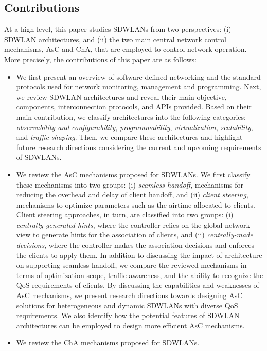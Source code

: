 \subsection{Contributions}
\label{contributions_sec}
At a high level, this paper studies SDWLANs from two perspectives: (i) SDWLAN architectures, and (ii) the two main central network control mechanisms, AsC and ChA, that are employed to control network operation.
More precisely, the contributions of this paper are as follows:
%
%
\begin{itemize}
	\item 
	We first present an overview of software-defined networking and the standard protocols used for network monitoring, management and programming.
	Next, we review SDWLAN architectures and reveal their main objective, components, interconnection protocols, and APIs provided.
	Based on their main contribution, we classify architectures into the following categories: \textit{observability and configurability},  \textit{programmability}, \textit{virtualization}, \textit{scalability}, and \textit{traffic shaping}.
	Then, we compare these architectures and highlight future research directions considering the current and upcoming requirements of SDWLANs. 
	\item We review the AsC mechanisms proposed for SDWLANs.
	We first classify these mechanisms into two groups:  
	(i) \textit{seamless handoff}, mechanisms for reducing the overhead and delay of client handoff, 
	and (ii) \textit{client steering}, mechanisms to optimize parameters such as the airtime allocated to clients.
	Client steering approaches, in turn, are classified into two groups: 
	(i) \textit{centrally-generated hints}, where the controller relies on the global network view to generate hints for the association of clients, and (ii) \textit{centrally-made decisions}, where the controller makes the association decisions and enforces the clients to apply them.
	In addition to discussing the impact of architecture on supporting seamless handoff, we compare the reviewed mechanisms in terms of optimization scope, traffic awareness, and the ability to recognize the QoS requirements of clients. 
	By discussing the capabilities and weaknesses of AsC mechanisms, we present research directions towards designing AsC solutions for heterogeneous and dynamic SDWLANs with diverse QoS requirements. 
	We also identify how the potential features of SDWLAN architectures can be employed to design more efficient AsC mechanisms.	
	\item We review the ChA mechanisms proposed for SDWLANs.

\end{itemize}
